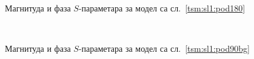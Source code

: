 \documentclass[main.tex]{subfiles}
\begin{document}
\begin{figure}[!t]
\centering
{}\\
\caption{Магнитуда и фаза $S$-параметара за модел са сл.~\ref{tsm:sl1:pod180}}
\label{tsm:rez:pod180}
\end{figure}
\begin{figure}[!t]
\centering
{}\\
\caption{Магнитуда и фаза $S$-параметара за модел са сл.~\ref{tsm:sl1:pod90bg}}
\label{tsm:rez:pod90bg}
\end{figure}
\end{document}

